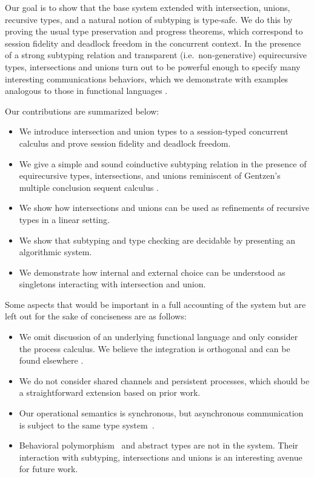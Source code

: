 \documentclass[a4paper,USenglish]{lipics-v2016}
\begin{document}
Our goal is to show that the base system extended with intersection, unions, recursive types, and a natural notion of subtyping is type-safe. We do this by proving the usual type preservation and progress theorems, which correspond to session fidelity and deadlock freedom in the concurrent context. In the presence of a strong subtyping relation and transparent (i.e.\ non-generative)  equirecursive types, intersections and unions turn out to be powerful enough to specify many interesting communications behaviors, which we demonstrate with examples analogous to those in functional languages \cite{FreemanP91,Dunfield03fossacs}.

Our contributions are summarized below:
\begin{itemize}
  \item We introduce intersection and union types to a session-typed concurrent calculus and prove session fidelity and deadlock freedom.
  \item We give a simple and sound coinductive subtyping relation in the presence of equirecursive types, intersections, and unions reminiscent of Gentzen's multiple conclusion sequent calculus \cite{Gentzen35, Girard87}.
  \item We show how intersections and unions can be used as refinements of recursive types in a linear setting.
  \item We show that subtyping and type checking are decidable by presenting an algorithmic system.
  \item We demonstrate how internal and external choice can be understood as singletons interacting with intersection and union.
\end{itemize}

Some aspects that would be important in a full accounting of the system but are left out for the sake of conciseness are as follows:
\begin{itemize}
  \item We omit discussion of an underlying functional language and only consider the process calculus. We believe the integration is orthogonal and can be found elsewhere \cite{ToninhoCP13,Toninho15phd,Griffith16phd}.
  \item We do not consider shared channels and persistent processes, which should be a straightforward extension based on prior work. \cite{CairesP10,PfenningG15}
  \item Our operational semantics is synchronous, but asynchronous communication~\cite{DeYoung12csl} is subject to the same type system~\cite{PfenningG15,Griffith16phd}.
  \item Behavioral polymorphism~\cite{Caires13esop} and abstract types are not in the system. Their interaction with subtyping, intersections and unions is an interesting avenue for future work.
\end{itemize}
\end{document}
